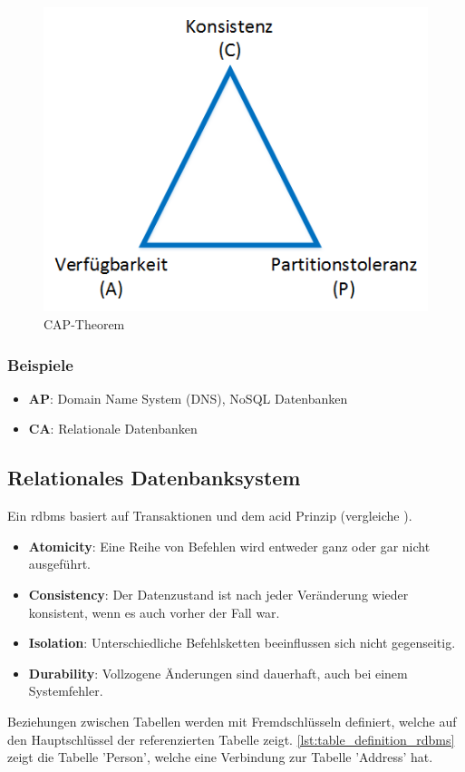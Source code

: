 \begin{figure}[h]
\centering
\includegraphics[scale=0.8]{images/visio/cap.png}
\caption[CAP-Theorem]{CAP-Theorem \selfmade{}}
\label{fig:cap}
\end{figure}

\subsubsection{Beispiele}

\begin{itemize}
	\item \textbf{AP}: Domain Name System (DNS), NoSQL Datenbanken
	\item \textbf{CA}: Relationale Datenbanken
\end{itemize}

\subsection{Relationales Datenbanksystem}\label{rdbms}
Ein \gls{rdbms} basiert auf Transaktionen und dem \gls{acid} Prinzip (vergleiche \cite{limited2010introduction}). 
\begin{itemize}
	\item \textbf{Atomicity}: Eine Reihe von Befehlen wird entweder ganz oder gar nicht ausgeführt.
	\item \textbf{Consistency}: Der Datenzustand ist nach jeder Veränderung wieder konsistent, wenn es auch vorher der Fall war.
	\item \textbf{Isolation}: Unterschiedliche Befehlsketten beeinflussen sich nicht gegenseitig.
	\item \textbf{Durability}: Vollzogene Änderungen sind dauerhaft, auch bei einem Systemfehler.
\end{itemize}
Beziehungen zwischen Tabellen werden mit Fremdschlüsseln definiert, welche auf den Hauptschlüssel der referenzierten Tabelle zeigt. \autoref{lst:table_definition_rdbms} zeigt die
Tabelle 'Person', welche eine Verbindung zur Tabelle 'Address' hat.

